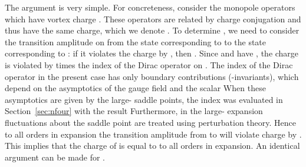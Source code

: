 \documentclass[a4paper,12pt, amsfonts, amssymb]{article}
\providecommand{\RR}{{\mathbb R}}
\renewcommand{\SS}{{\mathbb S}}
\providecommand{\tpsi}{{\tilde \psi}}
\providecommand{\n}{{N_V}}
\begin{document}
The argument is very simple. For concreteness, consider the monopole
operators \coordHE{} which have vortex charge \coordHE{}. These operators
are related by charge conjugation and thus have the same \coordHE{} charge,
which we denote \myHighlight{$\n$}\coordHE{}. To determine \myHighlight{$\n$}\coordHE{}, we need to consider the
transition amplitude on \myHighlight{$\SS^2\times\RR$}\coordHE{} from the state corresponding to 
\coordHE{} to the state corresponding to \coordHE{}: if it violates the 
\coordHE{} charge by \coordHE{}, then \myHighlight{$\n=-m/2$}\coordHE{}. Since \myHighlight{$\psi$}\coordHE{} and \myHighlight{$\tpsi$}\coordHE{} have
\coordHE{}, the charge is violated by \coordHE{} times the index of the Dirac
operator on \myHighlight{$\SS^2\times\RR$}\coordHE{}. The index of the Dirac operator in the
present case has only boundary contributions (\myHighlight{$\eta$}\coordHE{}-invariants),
which depend on the asymptotics of the gauge field and the scalar \coordHE{}
When these asymptotics are given by the large-\coordHE{} saddle points,
the index was evaluated in Section~\ref{sec:nfour} with the result
\coordHE{} Furthermore, in the large-\coordHE{} expansion fluctuations
about the saddle point are treated using perturbation theory.
Hence to all orders in \coordHE{} expansion the transition amplitude
from \coordHE{} to \coordHE{} will violate \coordHE{} charge by \coordHE{}.
This implies that the \coordHE{} charge of \coordHE{} is equal to \coordHE{} to
all orders in \coordHE{} expansion. An identical argument can be made for
\coordHE{}.
\end{document}
